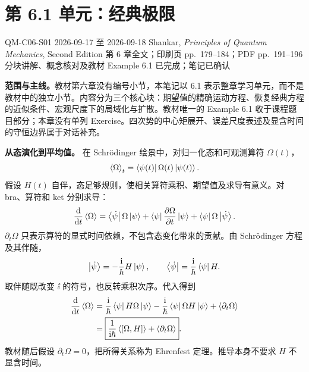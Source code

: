 \section{第 6.1 单元：经典极限}
\label{section:QM-C06-S01}

\studymeta
  {QM-C06-S01}
  {2026-09-17 至 2026-09-18}
  {Shankar, \textit{Principles of Quantum Mechanics}, Second Edition}
  {第 6 章全文；印刷页 pp.~179--184；PDF pp.~191--196}
  {分块讲解、概念核对及教材 Example 6.1 已完成；笔记已确认}

\textbf{范围与主线。}教材第六章没有编号小节，本笔记以 6.1 表示整章学习单元，而不是教材中的独立小节。内容分为三个核心块：期望值的精确运动方程、恢复经典方程的近似条件、宏观尺度下的局域化与扩散。教材唯一的 Example 6.1 收于课程题目部分；本章没有单列 Exercise。四次势的中心矩展开、误差尺度表述及显含时间的守恒边界属于对话补充。



\textbf{从态演化到平均值。}
在 Schr\"odinger 绘景中，对归一化态和可观测算符 $\Omega(t)$，
\begin{equation}
  \left\langle \Omega \right\rangle_t=\left\langle \psi(t)\right|\Omega(t)\left|\psi(t)\right\rangle.
\end{equation}
假设 $H(t)$ 自伴，态足够规则，使相关算符乘积、期望值及求导有意义。对 bra、算符和 ket 分别求导：
\begin{equation}
  \frac{\mathop{}\!\mathrm{d} }{\mathop{}\!\mathrm{d} t}\left\langle \Omega \right\rangle
  =\left\langle \dot\psi\right|\Omega\left|\psi\right\rangle
   +\left\langle \psi\right|\frac{\partial \Omega}{\partial t}\left|\psi\right\rangle
   +\left\langle \psi\right|\Omega\left|\dot\psi\right\rangle.
\end{equation}
$\partial_t\Omega$ 只表示算符的显式时间依赖，不包含态变化带来的贡献。由 Schr\"odinger 方程及其伴随，
\begin{equation}
  \left|\dot\psi\right\rangle=-\frac{\mathrm{i}}{\hbar}H\left|\psi\right\rangle,
  \qquad
  \left\langle \dot\psi\right|=\frac{\mathrm{i}}{\hbar}\left\langle \psi\right| H.
\end{equation}
取伴随既改变 $\ii$ 的符号，也反转乘积次序。代入得到
\begin{align}
  \frac{\mathop{}\!\mathrm{d} }{\mathop{}\!\mathrm{d} t}\left\langle \Omega \right\rangle
  &=\frac{\mathrm{i}}{\hbar}\left\langle \psi\right| H\Omega\left|\psi\right\rangle
    -\frac{\mathrm{i}}{\hbar}\left\langle \psi\right|\Omega H\left|\psi\right\rangle
    +\left\langle \partial_t\Omega \right\rangle\\
  &=\boxed{\frac{1}{\mathrm{i}\hbar}\left\langle [\Omega,H] \right\rangle
    +\left\langle \partial_t\Omega \right\rangle}.
  \label{eq:QM-C06-S01-ehrenfest}
\end{align}
教材随后假设 $\partial_t\Omega=0$，把所得关系称为 Ehrenfest 定理。推导本身不要求 $H$ 不显含时间。

